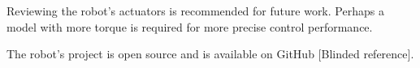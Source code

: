 \documentclass[conference]{IEEEtran}
\begin{document}
Reviewing the robot's actuators is recommended for future work. Perhaps a model with more torque is required for more precise control performance.

The robot's project is open source and is available on GitHub [Blinded reference]. %









\end{document}
